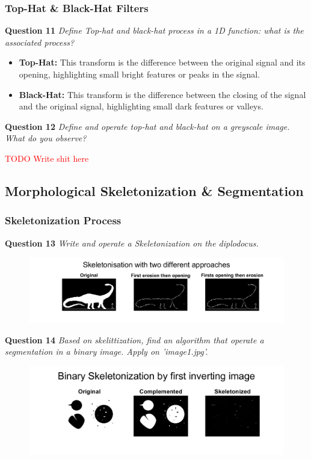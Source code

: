 \newpage
\subsubsection{Top-Hat \& Black-Hat Filters}
\textbf{Question 11} \textit{Deﬁne Top-hat and black-hat process in a 1D function: what is the associated process?}

\begin{itemize}
    \item \textbf{Top-Hat:} This transform is the difference between the original signal and its opening, highlighting small bright features or peaks in the signal.

    \item \textbf{Black-Hat:} This transform is the difference between the closing of the signal and the original signal, highlighting small dark features or valleys.
\end{itemize}


\textbf{Question 12} \textit{Deﬁne and operate top-hat and black-hat on a greyscale image. What do you observe?}

\textcolor{red}{TODO Write shit here}


\subsection{Morphological Skeletonization \& Segmentation}
\subsubsection{Skeletonization Process}
\textbf{Question 13} \textit{Write and operate a Skeletonization on the diplodocus.}

\begin{figure}[H]
    \centering
    \includegraphics[width=\linewidth]{Doc/Graphics/Part2/part2_Q13.png}
\end{figure}


\textbf{Question 14} \textit{Based on skelittization, ﬁnd an algorithm that operate a segmentation in a binary image. Apply on ’image1.jpg’.}

\begin{figure}[H]
    \centering
    \includegraphics[width=\linewidth]{Doc/Graphics/Part2/part2_Q14.png}
\end{figure}



